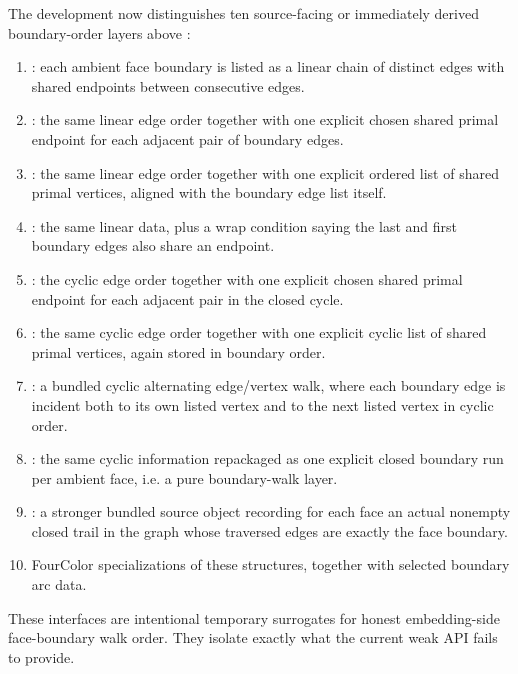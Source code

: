 \documentclass[11pt]{article}
\begin{document}
The development now distinguishes ten source-facing or immediately derived
boundary-order layers above
:
\begin{enumerate}
\item {}: each ambient face boundary is listed as a
linear chain of distinct edges with shared endpoints between consecutive edges.
\item {}: the same linear edge order together
with one explicit chosen shared primal endpoint for each adjacent pair of
boundary edges.
\item {}: the same linear edge order
together with one explicit ordered list of shared primal vertices, aligned with
the boundary edge list itself.
\item {}: the same linear data, plus a wrap
condition saying the last and first boundary edges also share an endpoint.
\item {}: the cyclic edge order together
with one explicit chosen shared primal endpoint for each adjacent pair in the
closed cycle.
\item {}: the same cyclic edge
order together with one explicit cyclic list of shared primal vertices, again
stored in boundary order.
\item {}: a bundled cyclic alternating
edge/vertex walk, where each boundary edge is incident both to its own listed
vertex and to the next listed vertex in cyclic order.
\item {}: the same cyclic information
repackaged as one explicit closed boundary run per ambient face, i.e. a pure
boundary-walk layer.
\item {}: a stronger bundled source object
recording for each face an actual nonempty closed trail in the graph whose
traversed edges are exactly the face boundary.
\item FourColor specializations of these structures, together with selected
boundary arc data.
\end{enumerate}

These interfaces are intentional temporary surrogates for honest embedding-side
face-boundary walk order. They isolate exactly what the current weak API fails
to provide.
\end{document}
